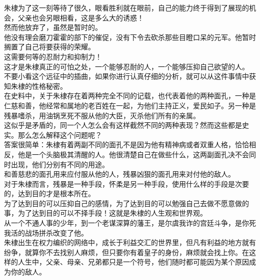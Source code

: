 \begin{multicols}{\theparacolNo}
朱棣为了这一刻等待了很久，眼看胜利就在眼前，自己的能力终于得到了展现的机会，父亲也会另眼相看，这是多么大的诱惑！\\

然而他放弃了，虽然是暂时的。\\

他没有理会磨刀霍霍的部下的催促，没有下令去砍杀那些目瞪口呆的元军。他暂时搁置了自己将要获得的荣耀。\\

这需要何等的忍耐力和抑制力！\\

这才是朱棣真正的可怕之处，一个能够忍耐的人，一个能够压抑自己欲望的人。\\

不要小看这个远征中的插曲，如果你进行认真仔细的分析，就可以从这件事情中获知朱棣的性格秘密。\\

在史料中，关于朱棣存在着两种完全不同的记载，也代表着他的两种面孔，一种是仁慈和善，他经常和属地的老百姓在一起，为他们主持正义，爱民如子。另一种是残暴嗜杀，用油锅烹死不服从他的大臣，灭杀他们所有的亲属。\\

这似乎是矛盾的，同一个人怎么会有这样截然不同的两种表现？然而这些都是史实。那么怎么解释这个问题呢？\\

答案很简单：朱棣有着两副不同的面孔不是因为他有精神病或者双重人格，恰恰相反，他是一个头脑极其清醒的人。他很清楚自己在做些什么，这两副面孔决不会同时出现，他们分别有不同的用途。\\

和善慈悲的面孔用来应付服从他的人，残暴凶狠的面孔用来对付他的敌人。\\

对于朱棣而言，残暴是一种手段，怀柔是另一种手段，使用什么样的手段是次要的，达到目的才是根本所在。\\

为了达到目的可以压抑自己的感情，为了达到目的可以勉强自己去做不愿意做的事，为了达到目的可以不择手段！这就是朱棣的人生观和世界观。\\

从一个不通人事的少年，到一个老谋深算的藩王，是尔虞我诈的宫廷斗争，是你死我活的战场拼杀改变了他。\\

朱棣出生在权力编织的网络中，成长于利益交汇的世界里，但凡有利益的地方就有纷争，就算你不去找别人麻烦，但只要你有着皇子的身份，麻烦就会找上你。在这样的人生中，父亲、母亲、兄弟都只是一个符号，他们随时都可能因为某个原因成为你的敌人。\\


\end{multicols}
